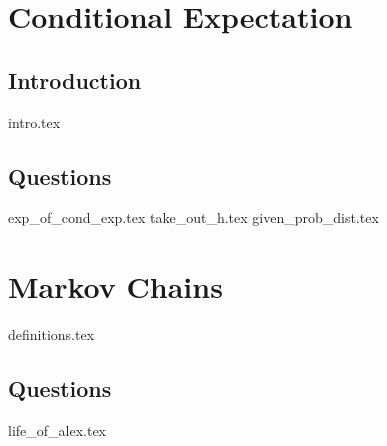 \documentclass{exam}
\begin{document}
\section{Conditional Expectation}
\subsection{Introduction}
{intro.tex}
\subsection{Questions}
\begin{questions}
{exp_of_cond_exp.tex}
{take_out_h.tex}
{given_prob_dist.tex}
\end{questions}

\section{Markov Chains}
{definitions.tex}
\subsection{Questions}
\begin{questions}
{life_of_alex.tex}
\end{questions}
\end{document}
